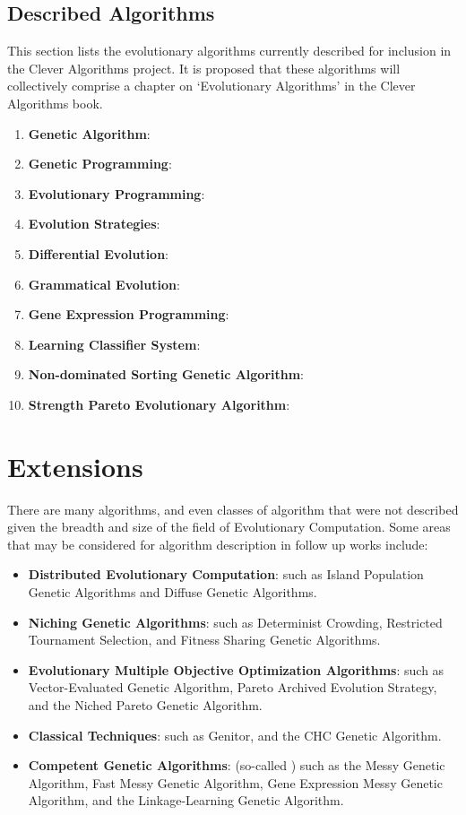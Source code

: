 \documentclass[a4paper, 11pt]{article}
\begin{document}
% 
% 
\subsection{Described Algorithms}
\label{subsec:algorithms}
This section lists the evolutionary algorithms currently described for inclusion in the Clever Algorithms project. It is proposed that these algorithms will collectively comprise a chapter on `Evolutionary Algorithms' in the Clever Algorithms book. 

\begin{enumerate}
	\item \textbf{Genetic Algorithm}: \cite{Brownlee2010p}
	\item \textbf{Genetic Programming}: \cite{Brownlee2010q}
	\item \textbf{Evolutionary Programming}: \cite{Brownlee2010r}
	\item \textbf{Evolution Strategies}: \cite{Brownlee2010s}
	\item \textbf{Differential Evolution}: \cite{Brownlee2010t}
	\item \textbf{Grammatical Evolution}: \cite{Brownlee2010u}
	\item \textbf{Gene Expression Programming}: \cite{Brownlee2010v}
	\item \textbf{Learning Classifier System}: \cite{Brownlee2010w}
	\item \textbf{Non-dominated Sorting Genetic Algorithm}: \cite{Brownlee2010x}
	\item \textbf{Strength Pareto Evolutionary Algorithm}: \cite{Brownlee2010y}
\end{enumerate}

% 
% 
\section{Extensions}
\label{sec:extensions}
There are many algorithms, and even classes of algorithm that were not described given the breadth and size of the field of Evolutionary Computation. Some areas that may be considered for algorithm description in follow up works include:

\begin{itemize}
	\item \textbf{Distributed Evolutionary Computation}: such as Island Population Genetic Algorithms and Diffuse Genetic Algorithms.
	\item \textbf{Niching Genetic Algorithms}: such as Determinist Crowding, Restricted Tournament Selection, and Fitness Sharing Genetic Algorithms.
	\item \textbf{Evolutionary Multiple Objective Optimization Algorithms}: such as Vector-Evaluated Genetic Algorithm, Pareto Archived Evolution Strategy, and the Niched Pareto Genetic Algorithm.
	\item \textbf{Classical Techniques}: such as Genitor, and the CHC Genetic Algorithm.
	\item \textbf{Competent Genetic Algorithms}: (so-called \cite{Goldberg2002}) such as the Messy Genetic Algorithm, Fast Messy Genetic Algorithm, Gene Expression Messy Genetic Algorithm, and the Linkage-Learning Genetic Algorithm.
\end{itemize}
\end{document}
